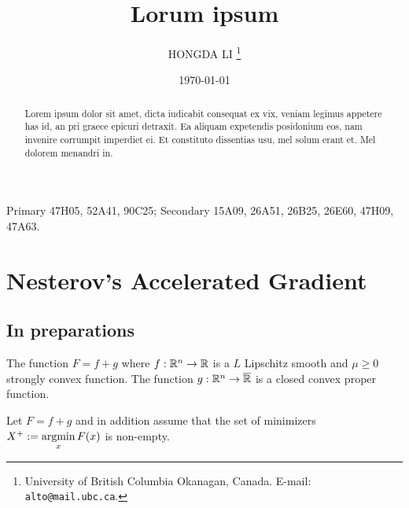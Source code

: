 \documentclass[12pt]{article}
\begin{document}
\title{{\selectfont Lorum ipsum}}

\author{
    HONGDA LI
    \thanks{
        University of British Columbia Okanagan,
        Canada. E-mail: \texttt{alto@mail.ubc.ca}.
    }
}

\date{\today}

\maketitle
{}

\begin{abstract} 
    \noindent
    Lorem ipsum dolor sit amet, dicta iudicabit consequat ex vix, veniam legimus appetere has id, an pri graece epicuri detraxit. Ea aliquam expetendis posidonium eos, nam invenire corrumpit imperdiet ei. Et constituto dissentias usu, mel solum erant et. Mel dolorem menandri in.
    \cite{nesterov_lectures_2018}
\end{abstract}

Primary 47H05, 52A41, 90C25; Secondary 15A09, 26A51, 26B25, 26E60, 47H09, 47A63.


\section{Nesterov's Accelerated Gradient}
    \subsection{In preparations}
        \begin{assumption}\label{ass:smooth-plus-nonsmooth}
            The function $F = f + g$ where $f:\mathbb R^n \rightarrow \mathbb R$ is a $L$ Lipschitz smooth and $\mu \ge 0$ strongly convex function. 
            The function $g:\mathbb R^n \rightarrow \overline {\mathbb R}$ is a closed convex proper function. 
        \end{assumption}
        \begin{assumption}\label{ass:smooth-plus-nonsmooth-x}
            Let $F = f + g$ and in addition assume that the set of minimizers $X^+ := \mathop{\rm argmin}\limits_{x}F(x)$ is non-empty. 
        \end{assumption}
\end{document}
